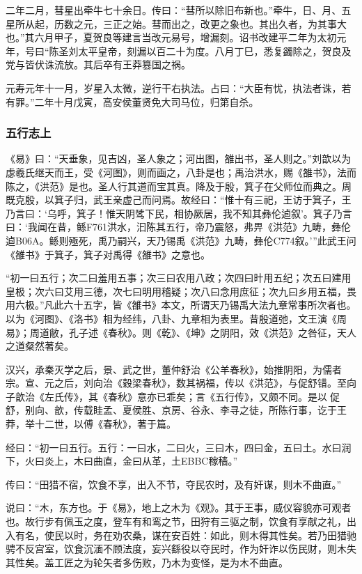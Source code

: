 \documentclass[]{article}
\begin{document}
二年二月，彗星出牵牛七十余日。传曰：``彗所以除旧布新也。''牵牛，日、月、五星所从起，历数之元，三正之始。彗而出之，改更之象也。其出久者，为其事大也。''其六月甲子，夏贺良等建言当改元易号，增漏刻。诏书改建平二年为太初元年，号曰``陈圣刘太平皇帝，刻漏以百二十为度。八月丁巳，悉复蠲除之，贺良及党与皆伏诛流放。其后卒有王莽篡国之祸。

元寿元年十一月，岁星入太微，逆行干右执法。占曰：``大臣有忧，执法者诛，若有罪。''二年十月戊寅，高安侯董贤免大司马位，归第自杀。

\hypertarget{header-n1986}{%
\subsubsection{五行志上}\label{header-n1986}}

《易》曰：``天垂象，见吉凶，圣人象之；河出图，雒出书，圣人则之。''刘歆以为虙羲氏继天而王，受《河图》，则而画之，八卦是也；禹治洪水，赐《雒书》，法而陈之，《洪范》是也。圣人行其道而宝其真。降及于殷，箕子在父师位而典之。周既克殷，以箕子归，武王亲虚己而问焉。故经曰：``惟十有三祀，王访于箕子，王乃言曰：`乌呼，箕子！惟天阴骘下民，相协厥居，我不知其彝伦逌叙'。箕子乃言曰：`我闻在昔，鲧F761洪水，汩陈其五行，帝乃震怒，弗畀《洪范》九畴，彝伦逌B06A。鲧则殛死，禹乃嗣兴，天乃锡禹《洪范》九畴，彝伦C774叙。'''此武王问《雒书》于箕子，箕子对禹得《雒书》之意也。

``初一曰五行；次二曰羞用五事；次三曰农用八政；次四曰旪用五纪；次五曰建用皇极；次六曰艾用三德，次七曰明用稽疑；次八曰念用庶征；次九曰乡用五福，畏用六极。''凡此六十五字，皆《雒书》本文，所谓天乃锡禹大法九章常事所次者也。以为《河图》、《洛书》相为经纬，八卦、九章相为表里。昔殷道弛，文王演《周易》；周道敝，孔子述《春秋》。则《乾》、《坤》之阴阳，效《洪范》之咎征，天人之道粲然著矣。

汉兴，承秦灭学之后，景、武之世，董仲舒治《公羊春秋》，始推阴阳，为儒者宗。宣、元之后，刘向治《穀梁春秋》，数其祸福，传以《洪范》，与促舒错。至向子歆治《左氏传》，其《春秋》意亦已乖矣；言《五行传》，又颇不同。是以促舒，别向、歆，传载眭孟、夏侯胜、京房、谷永、李寻之徒，所陈行事，讫于王莽，举十二世，以傅《春秋》，著于篇。

经曰：``初一曰五行。五行：一曰水，二曰火，三曰木，四曰金，五曰土。水曰润下，火曰炎上，木曰曲直，金曰从革，土EBBC稼穑。''

传曰：``田猎不宿，饮食不享，出入不节，夺民农时，及有奸谋，则木不曲直。''

说曰：``木，东方也。于《易》，地上之木为《观》。其于王事，威仪容貌亦可观者也。故行步有佩玉之度，登车有和鸾之节，田狩有三驱之制，饮食有享献之礼，出入有名，使民以时，务在劝农桑，谋在安百姓：如此，则木得其性矣。若乃田猎驰骋不反宫室，饮食沉湎不顾法度，妄兴繇役以夺民时，作为奸诈以伤民财，则木失其性矣。盖工匠之为轮矢者多伤败，乃木为变怪，是为木不曲直。
\end{document}

